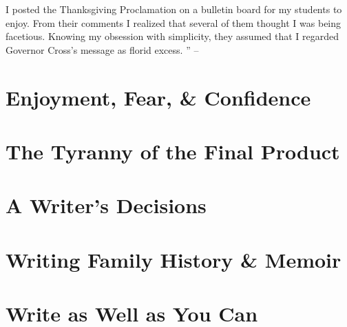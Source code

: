 \documentclass{article}
\numberwithin{equation}{section}
\begin{document}
I posted the Thanksgiving Proclamation on a bulletin board for my students to enjoy. From their comments I realized that several of them thought I was being facetious. Knowing my obsession with simplicity, they assumed that I regarded Governor Cross's message as florid excess.
'' -- \cite[pp. 217--]{Zinsser2016}


\section{Enjoyment, Fear, \& Confidence}


\section{The Tyranny of the Final Product}


\section{A Writer's Decisions}


\section{Writing Family History \& Memoir}


\section{Write as Well as You Can}


\printbibliography[heading=bibintoc]
	
\end{document}

